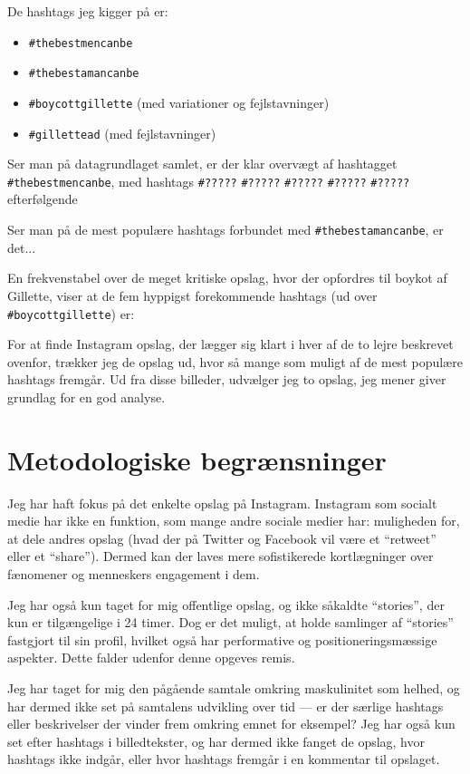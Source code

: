 De hashtags jeg kigger på er:
\begin{itemize}
    \item
        \texttt{\#thebestmencanbe}
    \item
        \texttt{\#thebestamancanbe}
    \item
        \texttt{\#boycottgillette} (med variationer og 
        fejlstavninger)
    \item
        \texttt{\#gillettead} (med fejlstavninger)
\end{itemize}

Ser man på datagrundlaget samlet, er der klar overvægt af 
hashtagget \texttt{\#thebestmencanbe}, med hashtags
\texttt{\#?????} \texttt{\#?????} \texttt{\#?????}
\texttt{\#?????} \texttt{\#?????} efterfølgende

Ser man på de mest populære
hashtags forbundet med \texttt{\#thebestamancanbe}, er det...

En frekvenstabel over de meget kritiske opslag, hvor der opfordres 
til boykot af Gillette, viser at de fem hyppigst forekommende 
hashtags (ud over \texttt{\#boycottgillette}) er:

For at finde Instagram opslag, der lægger sig klart i hver af de 
to lejre beskrevet ovenfor, trækker jeg de opslag ud, hvor så 
mange som muligt af de mest populære hashtags fremgår. Ud fra 
disse billeder, udvælger jeg to opslag, jeg mener giver grundlag 
for en god analyse.

\section{Metodologiske begrænsninger}
Jeg har haft fokus på det enkelte opslag på Instagram. Instagram 
som socialt medie har ikke en funktion, som mange andre sociale 
medier har: muligheden for, at dele andres opslag (hvad der på 
Twitter og Facebook vil være et “retweet” eller et “share”).  
Dermed kan der laves mere sofistikerede kortlægninger over 
fænomener og menneskers engagement i dem.

Jeg har også kun taget for mig offentlige opslag, og ikke såkaldte 
“stories”, der kun er tilgængelige i 24 timer. Dog er det muligt, 
at holde samlinger af “stories” fastgjort til sin profil, hvilket 
også har performative og positioneringsmæssige aspekter. Dette 
falder udenfor denne opgeves remis.

Jeg har taget for mig den pågående samtale omkring maskulinitet 
som helhed, og har dermed ikke set på samtalens udvikling over tid 
— er der særlige hashtags eller beskrivelser der vinder frem 
omkring emnet for eksempel? Jeg har også kun set efter hashtags i 
billedtekster, og har dermed ikke fanget de opslag, hvor hashtags 
ikke indgår, eller hvor hashtags fremgår i en kommentar til 
opslaget.


